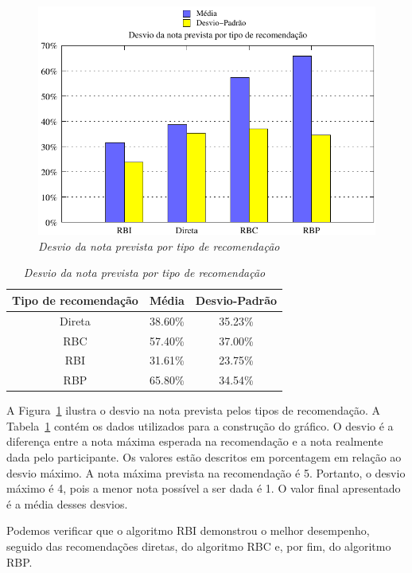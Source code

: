\begin{figure}
    \centering
    \includegraphics[width=\textwidth]{imagens/grafico_erro}
    \caption{\it Desvio da nota prevista por tipo de recomendação}
    \label{fig:erro}
\end{figure}

\begin{table}
\centering
\begin{tabular}{c c c}
    \hline \hline
    \textbf{Tipo de recomendação} & \textbf{Média}	& \textbf{Desvio-Padrão} \\
\hline 
Direta & 38.60\% & 35.23\% \\
\hline 
RBC & 57.40\% & 37.00\% \\
\hline 
RBI & 31.61\% & 23.75\% \\
\hline 
RBP & 65.80\% & 34.54\% \\
\hline        
\end{tabular}
\caption{\it Desvio da nota prevista por tipo de recomendação}
\label{table:erro}
\end{table}

A Figura~\ref{fig:erro} ilustra o desvio na nota prevista pelos tipos de recomendação. A Tabela~\ref{table:erro} contém os dados utilizados para a construção do gráfico. O desvio é a diferença entre a nota máxima esperada na recomendação e a nota realmente dada pelo participante. Os valores estão descritos em porcentagem em relação ao desvio máximo. A nota máxima prevista na recomendação é 5. Portanto, o desvio máximo é 4, pois a menor nota possível a ser dada é 1. O valor final apresentado é a média desses desvios.

Podemos verificar que o algoritmo RBI demonstrou o melhor desempenho, seguido das recomendações diretas, do algoritmo RBC e, por fim, do algoritmo RBP.

